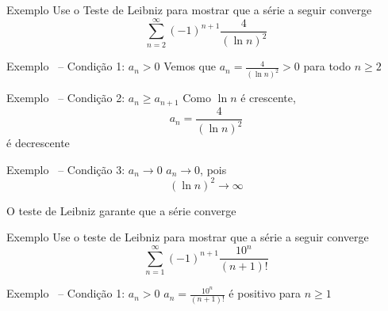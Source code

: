 \documentclass[fleqn,utf8,aspectratio=169,12pt]{beamer}
\begin{document}
\addtocounter{exemplo}{1}
\begin{frame}{Exemplo \theexemplo}
  Use o Teste de Leibniz para mostrar que a série a seguir converge
  \[
    \sum_{n=2}^\infty(-1)^{n+1}\frac{4}{(\ln n)^2}
  \]
\end{frame}

\begin{frame}{Exemplo \theexemplo\ -- Condição 1: \(a_n>0\)}
  \pause
  Vemos que
  \(
    a_n = \frac{4}{(\ln n)^2} > 0
  \)
  para todo $n\geq 2$
\end{frame}

\begin{frame}{Exemplo \theexemplo\ -- Condição 2: \(a_n\geq a_{n+1}\)}
  \pause
  Como  \(\ln n\) é crescente\pause,
  \[
    a_n = \frac{4}{(\ln n)^2}
  \]
  é decrescente
\end{frame}

\begin{frame}{Exemplo \theexemplo\ -- Condição 3: \(a_n\to 0\)}
  \pause
  $a_n\to 0$, pois
  \[
    \left(\ln n\right)^2\to \infty
  \]

  \pause
  \vspace{\baselineskip}
  O teste de Leibniz garante que a série converge
\end{frame}

\addtocounter{exemplo}{1}
\begin{frame}{Exemplo \theexemplo}
  Use o teste de Leibniz para mostrar que a série a seguir converge
  \[
    \sum_{n=1}^\infty(-1)^{n+1}\frac{10^n}{(n+1)!}
  \]
\end{frame}

\begin{frame}{Exemplo \theexemplo\ -- Condição 1: \(a_n>0\)}
  \pause
  \(
    a_n = \frac{10^n}{(n+1)!}
  \)
  é positivo para \(n\geq 1\)
\end{frame}
\end{document}
